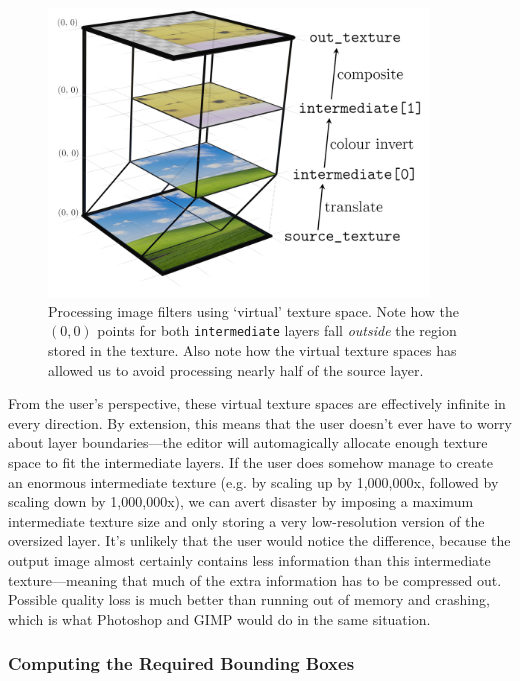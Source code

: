 \documentclass[12pt]{article}
\begin{document}
\begin{figure}
    \begin{center}
        \includegraphics[width=0.9\textwidth]{filter-stacking}
    \end{center}
    \caption{Processing image filters using `virtual' texture space.  Note how the $(0, 0)$ points
    for both \texttt{intermediate} layers fall \emph{outside} the region stored in the
    texture.  Also note how the virtual texture spaces has allowed us to avoid processing nearly
    half of the source layer.}\label{fig:virt-tex-space}
\end{figure}

From the user's perspective, these virtual texture spaces are effectively infinite in every
direction.  By extension, this means that the user doesn't ever have to worry about layer
boundaries---the editor will automagically allocate enough texture space to fit the intermediate
layers.  If the user does somehow manage to create an enormous intermediate texture (e.g. by
scaling up by 1,000,000x, followed by scaling down by 1,000,000x), we can avert disaster by imposing
a maximum intermediate texture size and only storing a very low-resolution version of the oversized
layer.  It's unlikely that the user would notice the difference, because the output image almost
certainly contains less information than this intermediate texture---meaning that much of the extra
information has to be compressed out.  Possible quality loss is much better than running out of
memory and crashing, which is what Photoshop and GIMP would do in the same situation.

\subsubsection{Computing the Required Bounding Boxes}
\end{document}
